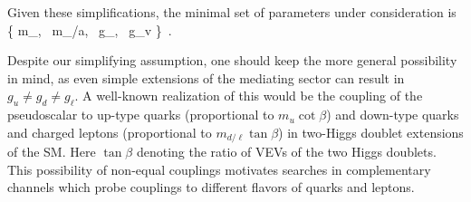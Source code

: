 Given these simplifications, the minimal set of parameters under consideration is
 \bea
  \left\{ m_\chi,~ m_{\phi/a},~ g_\chi,~ g_v \right\} \,.
 \eea

Despite our simplifying assumption, one should keep the more general possibility in mind, as even simple extensions of the mediating sector can result in $g_u \neq g_d \neq g_\ell$. A well-known realization of this would be the coupling of the pseudoscalar to up-type quarks (proportional to $m_u \cot\beta$) and down-type quarks and charged leptons (proportional to $m_{d/\ell}\tan\beta$) in two-Higgs doublet extensions of the SM. Here $\tan \beta$ denoting the ratio of VEVs of the two Higgs doublets. %
This possibility of non-equal couplings motivates searches in complementary channels which probe couplings to different flavors of quarks and leptons.




